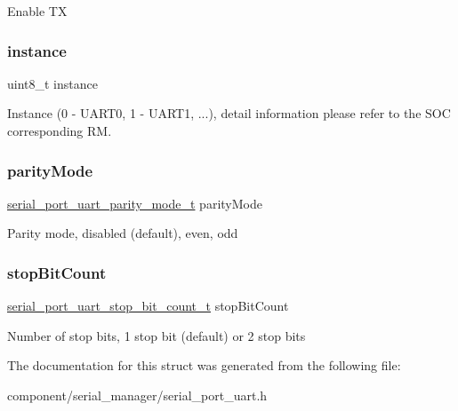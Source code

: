 Enable TX \mbox{\label{struct__serial__port__uart__config_a0247bf27ecd553eeb029a06b1e6ec354}} 
\subsubsection{\texorpdfstring{instance}{instance}}
{\footnotesize\ttfamily uint8\+\_\+t instance}

Instance (0 -\/ U\+A\+R\+T0, 1 -\/ U\+A\+R\+T1, ...), detail information please refer to the S\+OC corresponding RM. \mbox{\label{struct__serial__port__uart__config_a9c90a7fdfd19cd1c99826dbbebea2d96}} 
\subsubsection{\texorpdfstring{parityMode}{parityMode}}
{\footnotesize\ttfamily \mbox{\hyperlink{group__serial__port__uart_ga3980002a1791549605701a7822bec4ba}{serial\+\_\+port\+\_\+uart\+\_\+parity\+\_\+mode\+\_\+t}} parity\+Mode}

Parity mode, disabled (default), even, odd \mbox{\label{struct__serial__port__uart__config_a5f63f60b4ce406506c35be15323ad266}} 
\subsubsection{\texorpdfstring{stopBitCount}{stopBitCount}}
{\footnotesize\ttfamily \mbox{\hyperlink{group__serial__port__uart_ga2a0798b3cc6db94c65bf067bcfe73b12}{serial\+\_\+port\+\_\+uart\+\_\+stop\+\_\+bit\+\_\+count\+\_\+t}} stop\+Bit\+Count}

Number of stop bits, 1 stop bit (default) or 2 stop bits 

The documentation for this struct was generated from the following file\+:\begin{DoxyCompactItemize}
\item 
component/serial\+\_\+manager/serial\+\_\+port\+\_\+uart.\+h\end{DoxyCompactItemize}
